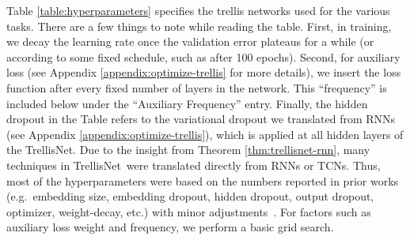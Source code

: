 \documentclass{article} \usepackage{iclr2019_conference,times}
\newcommand{\model}{TrellisNet}
\begin{document}
Table \ref{table:hyperparameters} specifies the trellis networks used for the various tasks. There are a few things to note while reading the table. First, in training, we decay the learning rate once the validation error plateaus for a while (or according to some fixed schedule, such as after 100 epochs). Second, for auxiliary loss (see Appendix \ref{appendix:optimize-trellis} for more details), we insert the loss function after every fixed number of layers in the network. This ``frequency'' is included below under the ``Auxiliary Frequency'' entry. Finally, the hidden dropout in the Table refers to the variational dropout we translated from RNNs (see Appendix \ref{appendix:optimize-trellis}), which is applied at all hidden layers of the \model. Due to the insight from Theorem \ref{thm:trellisnet-rnn}, many techniques in \model~were translated directly from RNNs or TCNs. Thus, most of the hyperparameters were based on the numbers reported in prior works (e.g.\ embedding size, embedding dropout, hidden dropout, output dropout, optimizer, weight-decay, etc.)  with minor adjustments~\citep{merityRegOpt,yang2018breaking,bradbury2016quasi,merity2018analysis,trinh2018learning,bai2018empirical,santoro2018relational}. For factors such as auxiliary loss weight and frequency, we perform a basic grid search.
\end{document}
